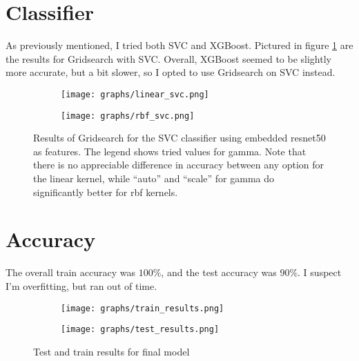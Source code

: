 \documentclass{article}
\begin{document}
\section{Classifier}

As previously mentioned, I tried both SVC and XGBoost.
Pictured in figure \ref*{fig:svc} are the results for Gridsearch with SVC.
Overall, XGBoost seemed to be slightly more accurate, but a bit slower, so I opted to use Gridsearch on SVC instead.

\begin{figure}
    \centering
    \begin{subfigure}[b]{0.45\linewidth}
		\texttt{[image: graphs/linear\_svc.png]}
	\end{subfigure}
	\begin{subfigure}[b]{0.45\linewidth}
		\texttt{[image: graphs/rbf\_svc.png]}
	\end{subfigure}
    \caption{Results of Gridsearch for the SVC classifier using embedded resnet50 as features.
    The legend shows tried values for gamma.
    Note that there is no appreciable difference in accuracy between any option for the linear kernel,
    while ``auto'' and ``scale'' for gamma do significantly better for rbf kernels.
    }\label{fig:svc}
\end{figure}

\section{Accuracy}

The overall train accuracy was $100\%$, and the test accuracy was $90\%$. I suspect I'm overfitting, but ran out of time.

\begin{figure}
    \centering
    \begin{subfigure}[b]{0.45\linewidth}
		\texttt{[image: graphs/train\_results.png]}
	\end{subfigure}
	\begin{subfigure}[b]{0.45\linewidth}
		\texttt{[image: graphs/test\_results.png]}
	\end{subfigure}
    \caption{Test and train results for final model
    }\label{fig:linear_svc}
\end{figure}
\end{document}
